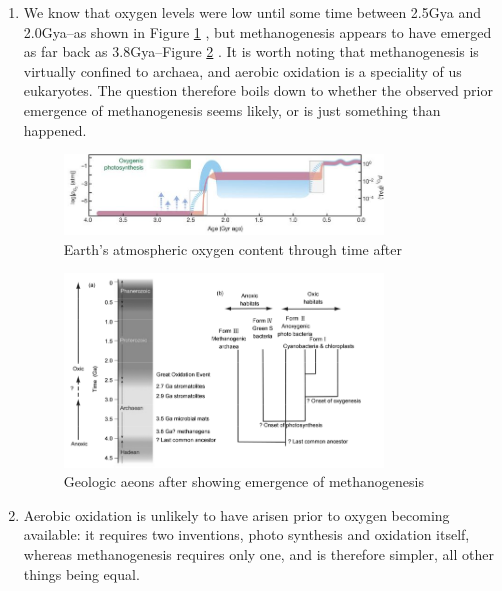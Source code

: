\documentclass[]{article}
\begin{document}
\begin{enumerate}
	\item We know that oxygen levels were low until some time between 2.5Gya and 2.0Gya--as shown in Figure \ref{fig:nature13068-f1} \cite{lyons2014rise}, but  methanogenesis appears to have emerged as far back as 3.8Gya--Figure \ref{fig:nisbet2011evolution} \cite{nisbet2011evolution}. It is worth noting that methanogenesis is virtually confined to archaea\cite{angel2012methanogenic}, and aerobic oxidation is a speciality of us eukaryotes. The question therefore boils down to whether the observed prior emergence of methanogenesis seems likely, or is just something than happened.
	\begin{figure}[H]
		\caption{Earth’s atmospheric oxygen content through time after \cite{lyons2014rise} }\label{fig:nature13068-f1}
		\includegraphics[width=0.8\textwidth]{nature13068-f1}
	\end{figure}
	
	\begin{figure}[H]
		\caption{Geologic aeons after \cite{nisbet2011evolution} showing emergence of methanogenesis}\label{fig:nisbet2011evolution}
		\includegraphics[width=0.8\textwidth]{nisbet2011evolution}
	\end{figure}
	
	\item Aerobic oxidation is unlikely to have arisen prior to oxygen becoming available: it requires two inventions, photo synthesis and oxidation itself, whereas methanogenesis requires only one, and is therefore simpler, all other things being equal.
	

\end{enumerate}
\end{document}
